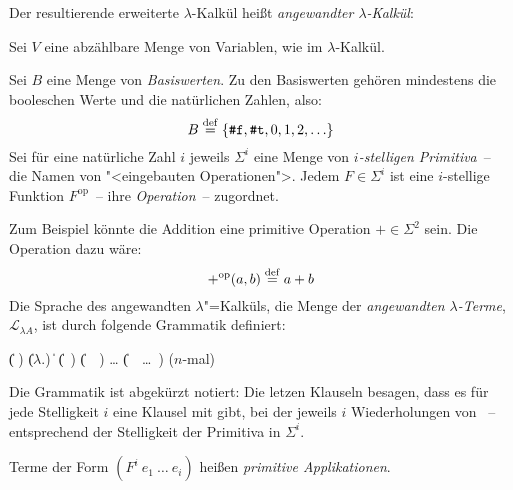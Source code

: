Der resultierende erweiterte $\lambda$-Kalkül heißt 
\textit{angewandter $\lambda$-Kalkül}:

\begin{definition}\label{def:lambda-angewandt}
  
  Sei $V$ eine abzählbare Menge von Variablen, wie im
  $\lambda$-Kalkül.

  Sei $B$ eine Menge von \textit{Basiswerten}.  Zu
  den Basiswerten gehören mindestens die booleschen Werte und die
  natürlichen Zahlen, also:
  \begin{displaymath}
    B \stackrel{\rm def}{=}{} \{ \texttt{\#f}, \texttt{\#t}, 0, 1, 2, \ldots \}
  \end{displaymath}
  Sei für eine natürliche Zahl $i$ jeweils $\Sigma^i$ eine Menge von
  \textit{$i$-stelligen Primitiva}~-- die Namen von
  "<eingebauten Operationen">.  Jedem $F\in\Sigma^i$ ist eine
  $i$-stellige Funktion $F^{\textrm{op}}$~-- ihre \textit{Operation}~--
  zugordnet.

  Zum Beispiel könnte die Addition eine primitive Operation
  $+\in \Sigma^2$ sein.  Die Operation dazu wäre:
  \begin{displaymath}
    +^{\textrm{op}}(a, b) \stackrel{\rm def}{=} a + b
  \end{displaymath}
  Die Sprache des angewandten
  $\lambda$"=Kalküls, die Menge der \textit{angewandten
    $\lambda$-Terme},
  $\mathcal{L}_{\lambda{}A}$, ist
  durch folgende Grammatik definiert:
  \begin{grammar}
     \: 
    \> \| ( )
    \> \| ($\lambda$.)
    \> \| 
    \> \| (~)
    \> \| (~~)
    \> \ldots
    \> \| (~~\ldots~) \quad \textrm{($n$-mal)}
  \end{grammar}
  Die Grammatik ist abgekürzt notiert: Die letzen Klauseln besagen,
  dass es für jede Stelligkeit $i$ eine Klausel mit  gibt,
  bei der jeweils $i$ Wiederholungen von
  ~-- entsprechend der Stelligkeit
  der Primitiva in $\Sigma^i$.

  Terme der Form $(F^i~e_1~\ldots~e_i)$ heißen
  \textit{primitive Applikationen}.
\end{definition}
